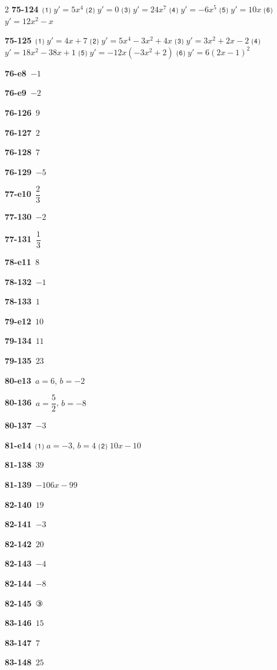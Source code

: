 \documentclass[10pt,a4paper]{article}
\begin{document}
\begin{multicols}{2}
\noindent\textbf{75-124}\ ⑴ $y'=5x^4$ ⑵ $y'=0$ ⑶ $y'=24x^7$ ⑷ $y'=-6x^5$ ⑸ $y'=10x$ ⑹ $y'=12x^2-x$\par
\noindent\textbf{75-125}\ ⑴ $y'=4x+7$ ⑵ $y'=5x^4-3x^2+4x$ ⑶ $y'=3x^2+2x-2$ ⑷ $y'=18x^2-38x+1$ ⑸ $y'=-12x(-3x^2+2)$ ⑹ $y'=6(2x-1)^2$\par
\noindent\textbf{76-e8}\ $-1$\par
\noindent\textbf{76-e9}\ $-2$\par
\noindent\textbf{76-126}\ $9$\par
\noindent\textbf{76-127}\ $2$\par
\noindent\textbf{76-128}\ $7$\par
\noindent\textbf{76-129}\ $-5$\par
\noindent\textbf{77-e10}\ $\dfrac{2}{3}$\par
\noindent\textbf{77-130}\ $-2$\par
\noindent\textbf{77-131}\ $\dfrac{1}{3}$\par
\noindent\textbf{78-e11}\ $8$\par
\noindent\textbf{78-132}\ $-1$\par
\noindent\textbf{78-133}\ $1$\par
\noindent\textbf{79-e12}\ $10$\par
\noindent\textbf{79-134}\ $11$\par
\noindent\textbf{79-135}\ $23$\par
\noindent\textbf{80-e13}\ $a=6$, $b=-2$\par
\noindent\textbf{80-136}\ $a=\dfrac{5}{2}$, $b=-8$\par
\noindent\textbf{80-137}\ $-3$\par
\noindent\textbf{81-e14}\ ⑴ $a=-3$, $b=4$ ⑵ $10x-10$\par
\noindent\textbf{81-138}\ $39$\par
\noindent\textbf{81-139}\ $-106x-99$\par
\noindent\textbf{82-140}\ $19$\par
\noindent\textbf{82-141}\ $-3$\par
\noindent\textbf{82-142}\ $20$\par
\noindent\textbf{82-143}\ $-4$\par
\noindent\textbf{82-144}\ $-8$\par
\noindent\textbf{82-145}\ ③\par
\noindent\textbf{83-146}\ $15$\par
\noindent\textbf{83-147}\ $7$\par
\noindent\textbf{83-148}\ $25$\par

\end{multicols}
\end{document}

